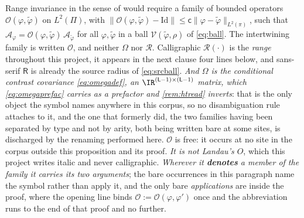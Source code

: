 \begin{proposition}\label{prp:norangeinv}
Range invariance in the sense of \citet[(2.6)--(2.7)]{hanke1995} would require a family of bounded
operators $\mathcal O(\varphi,\tilde\varphi)$ on $L^{2}(\Pi)$, with
$\|\mathcal O(\varphi,\tilde\varphi)-\mathrm{Id}\|\le\mathsf c\|\varphi-\tilde\varphi\|_{L^{2}(\pi)}$, such that
$\hat{\mathcal A}_\varphi=\mathcal O(\varphi,\tilde\varphi)\,\hat{\mathcal A}_{\tilde\varphi}$ for all
$\varphi,\tilde\varphi$ in a ball $\mathcal V(\tilde\varphi,\rho)$ of \eqref{eq:ball}.
The intertwining family is written $\mathcal O$, and neither $\Omega$ nor $\mathcal R$.
Calligraphic $\mathcal R(\cdot)$
is the \emph{range} throughout this project, it appears in the next clause four lines below, and
sans-serif $\mathsf R$ is already the source radius of \eqref{eq:srcball}. \emph{And $\Omega$ is the
conditional contrast covariance \eqref{eq:omegadef}, an $\IR^{(\mathsf L-1)\times(\mathsf L-1)}$
matrix, which \eqref{eq:omegaprefac} carries as a prefactor and \cref{rem:htread} inverts}: that is the
only object the symbol names anywhere in this corpus, so no disambiguation rule attaches to it, and the
one that formerly did, the two families having been separated by type and not by arity, both being
written bare at some sites, is discharged by the renaming performed here.
$\mathcal O$ is free: it occurs at no site in the
corpus outside this proposition and its proof. \emph{It is not Landau's $O$}, which this project writes
italic and never calligraphic. \emph{Wherever it \textbf{denotes} a member of the family it carries its
two arguments}; the bare occurrences in this paragraph name the symbol rather than apply it, and the only
bare \emph{applications} are inside the proof,
where the opening line binds $\mathcal O:=\mathcal O(\varphi,\varphi')$ once and the abbreviation runs to
the end of that proof and no further.
%

\end{proposition}
